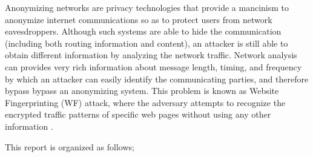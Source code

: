Anonymizing networks are privacy technologies that provide a mancinism to anonymize internet communications so as to protect users from network eavesdroppers. Although such systems are able to hide the communication (including both routing information and content), an attacker is still able to obtain different information by analyzing the network traffic. Network analysis can provides very rich information about message length, timing, and frequency by which an attacker can easily identify the communicating parties, and therefore bypass bypass an anonymizing system. This problem is known as Website Fingerprinting (WF) attack, where the adversary attempts to recognize the encrypted traffic patterns of specific web pages without using any other information \cite{juarez14, murdoch2005low}.



This report is organized as follows; %

